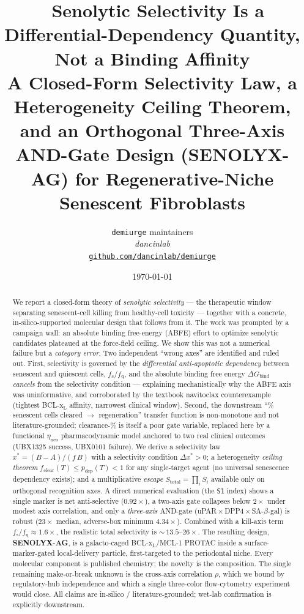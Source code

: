 \documentclass[11pt,a4paper]{article}
\title{
  \textbf{🧬 Senolytic Selectivity Is a Differential-Dependency Quantity,
  Not a Binding Affinity} \\[6pt]
  \large A Closed-Form Selectivity Law, a Heterogeneity Ceiling Theorem,
  and an Orthogonal Three-Axis AND-Gate Design (SENOLYX-AG)
  for Regenerative-Niche Senescent Fibroblasts
}
\author{
  \texttt{demiurge} maintainers\\
  \normalsize\textit{dancinlab}\\[2pt]
  \normalsize\href{https://github.com/dancinlab/demiurge}{\texttt{github.com/dancinlab/demiurge}}
}
\date{\today}
\newcommand{\fs}{f_{\mathrm{s}}}
\newcommand{\fq}{f_{\mathrm{q}}}
\newcommand{\Stot}{S_{\mathrm{total}}}
\newcommand{\fclear}{f_{\mathrm{clear}}}
\newcommand{\pdep}{p_{\mathrm{dep}}}
\begin{document}
\maketitle

\begin{abstract}
We report a closed-form theory of \emph{senolytic selectivity} --- the
therapeutic window separating senescent-cell killing from healthy-cell
toxicity --- together with a concrete, in-silico-supported molecular design
that follows from it. The work was prompted by a campaign wall: an absolute
binding free-energy (ABFE) effort to optimize senolytic candidates plateaued
at the force-field ceiling. We show this was not a numerical failure but a
\emph{category error}. Two independent ``wrong axes'' are identified and ruled
out. First, selectivity is governed by the \emph{differential anti-apoptotic
dependency} between senescent and quiescent cells, $\fs/\fq$, and the absolute
binding free energy $\Delta G_{\mathrm{bind}}$ \emph{cancels} from the
selectivity condition --- explaining mechanistically why the ABFE axis was
uninformative, and corroborated by the textbook navitoclax counterexample
(tightest BCL-x$_{\mathrm L}$ affinity, narrowest clinical window). Second, the
downstream ``\% senescent cells cleared $\to$ regeneration'' transfer function
is non-monotone and not literature-grounded; clearance-\% is itself a poor gate
variable, replaced here by a functional $\eta_{\mathrm{neo}}$ pharmacodynamic
model anchored to two real clinical outcomes (UBX1325 success, UBX0101
failure). We derive a selectivity law $x^{*}=(B-A)/(f\,B)$ with a
selectivity condition $\Delta x^{*}>0$; a heterogeneity \emph{ceiling theorem}
$\fclear(T)\le\pdep(T)<1$ for any single-target agent (no universal
senescence dependency exists); and a multiplicative \emph{escape}
$\Stot=\prod_i S_i$ available only on orthogonal recognition axes. A direct
numerical evaluation (the \texttt{S1} index) shows a single marker is net
anti-selective ($0.92\times$), a two-axis gate collapses below $2\times$ under
modest axis correlation, and only a \emph{three-axis} AND-gate
(uPAR\,$\times$\,DPP4\,$\times$\,SA-$\beta$-gal) is robust ($23\times$ median,
adverse-box minimum $4.34\times$). Combined with a kill-axis term
$\fs/\fq\approx1.6\times$, the realistic total selectivity is
$\sim$\,$13.5$--$26\times$. The resulting design, \textbf{SENOLYX-AG}, is a
galacto-caged BCL-x$_{\mathrm L}$/MCL-1 PROTAC inside a surface-marker-gated
local-delivery particle, first-targeted to the periodontal niche. Every
molecular component is published chemistry; the novelty is the composition.
The single remaining make-or-break unknown is the cross-axis correlation
$\rho$, which we bound by regulatory-hub independence and which a single
three-color flow-cytometry experiment would close. All claims are in-silico /
literature-grounded; wet-lab confirmation is explicitly downstream.
\end{abstract}
\end{document}
